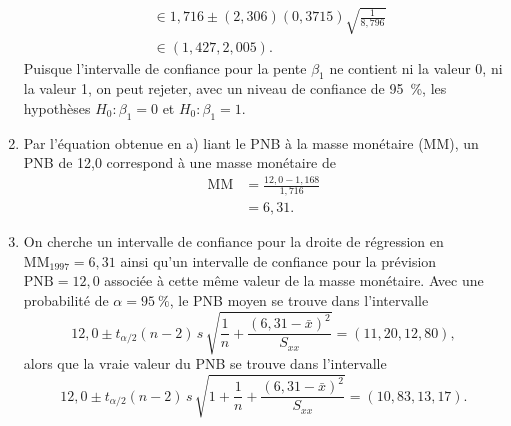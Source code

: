 \begin{solution}{2.16}
\begin{enumerate}
\begin{align*}
        &\in 1,716 \pm (2,306) (0,3715) \sqrt{\frac{1}{8,796}} \\
        &\in (1,427, 2,005).
      \end{align*}
      Puisque l'intervalle de confiance pour la pente $\beta_1$ ne
      contient ni la valeur 0, ni la valeur 1, on peut rejeter, avec
      un niveau de confiance de 95~\%, les hypothèses $H_0: \beta_1 =
      0$ et $H_0: \beta_1 = 1$.
    \item Par l'équation obtenue en a) liant le PNB à la masse
      monétaire (MM), un PNB de 12,0 correspond à une masse monétaire
      de
      \begin{align*}
        \text{MM}
        &= \frac{12,0 - 1,168}{1,716} \\
        &= 6,31.
      \end{align*}
    \item On cherche un intervalle de confiance pour la droite de
      régression en $\text{MM}_{1997} = 6,31$ ainsi qu'un intervalle
      de confiance pour la prévision $\text{PNB} = 12,0$ associée à
      cette même valeur de la masse monétaire.  Avec une probabilité
      de $\alpha = 95~\%$, le PNB moyen se trouve dans l'intervalle
      \begin{displaymath}
        12,0 \pm t_{\alpha/2}(n - 2)\, s\,
        \sqrt{\frac{1}{n} + \frac{(6,31 - \bar{x})^2}{S_{xx}}} =
        (11,20, 12,80),
      \end{displaymath}
      alors que la vraie valeur du PNB se trouve dans l'intervalle
      \begin{displaymath}
        12,0 \pm t_{\alpha/2}(n - 2)\, s\,
        \sqrt{1 + \frac{1}{n} + \frac{(6,31 - \bar{x})^2}{S_{xx}}} =
        (10,83, 13,17).
      \end{displaymath}
    \end{enumerate}
  
\end{solution}
